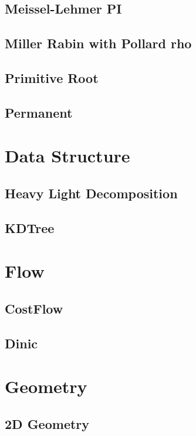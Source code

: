 \subsection{Meissel-Lehmer PI}

\subsection{Miller Rabin with Pollard rho}

\subsection{Primitive Root}

\subsection{Permanent}


\section{Data Structure}
\subsection{Heavy Light Decomposition}

\subsection{KDTree}


\section{Flow}
\subsection{CostFlow}

\subsection{Dinic}


\section{Geometry}
\subsection{2D Geometry}

